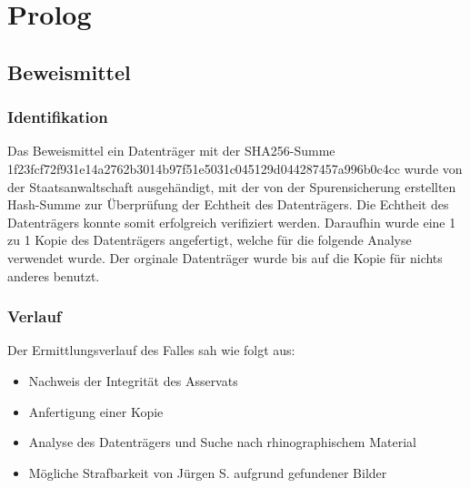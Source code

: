 \chapter{Prolog}

\section{Beweismittel}

\subsection{Identifikation}

Das Beweismittel ein Datenträger mit der SHA256-Summe\\
1f23fcf72f931e14a2762b3014b97f51e5031c045129d044287457a996b0c4cc wurde von der Staatsanwaltschaft ausgehändigt, mit der von der Spurensicherung erstellten Hash-Summe zur Überprüfung der Echtheit des Datenträgers. Die Echtheit des Datenträgers konnte somit erfolgreich verifiziert werden. Daraufhin wurde eine 1 zu 1 Kopie des Datenträgers angefertigt, welche für die folgende Analyse verwendet wurde. Der orginale Datenträger wurde bis auf die Kopie für nichts anderes benutzt.

\subsection{Verlauf}
Der Ermittlungsverlauf des Falles sah wie folgt aus:
	\begin{itemize}
	\item Nachweis der Integrität des Asservats
	\item Anfertigung einer Kopie
	\item Analyse des Datenträgers und Suche nach rhinographischem Material
	\item Mögliche Strafbarkeit von Jürgen S. aufgrund gefundener Bilder
	\end{itemize}

